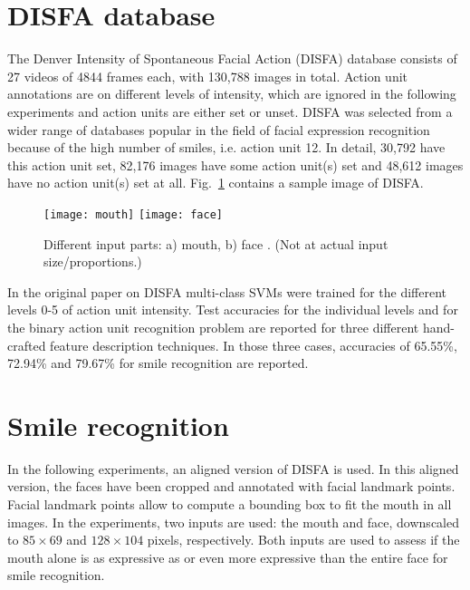 \documentclass{ws-procs9x6}
\begin{document}
\section{DISFA database}
\label{chapter:stateoftheart}
The Denver Intensity of Spontaneous Facial Action (DISFA) \cite{DISFA} database consists of 27 videos of 4844 frames each, with 130,788 images in total. Action unit annotations are on different levels of intensity, which are ignored in the following experiments and action units are either set or unset. DISFA was selected from a wider range of databases popular in the field of facial expression recognition because of the high number of smiles, i.e. action unit 12. In detail, 30,792 have this action unit set, 82,176 images have some action unit(s) set and 48,612 images have no action unit(s) set at all. Fig.~\ref{fig:mouth_face} contains a sample image of DISFA.

\begin{figure}[h!]
    \centering
    \hfill
    \texttt{[image: mouth]}
    \hfill
    \texttt{[image: face]}
    \hfill~
    \caption{Different input parts: a) mouth, b) face \cite{DISFA}. (Not at actual input size/proportions.)}
    \label{fig:mouth_face}
\end{figure}

In the original paper on DISFA \cite{DISFA} multi-class SVMs were trained for the different levels 0-5 of
action unit intensity. Test accuracies for the individual levels and for the binary action unit recognition
problem are reported for three different hand-crafted feature description techniques. In those three cases,
accuracies of 65.55\%, 72.94\% and 79.67\% for smile recognition are reported.



\section{Smile recognition}
\label{chapter:smile}
In the following experiments, an aligned version of DISFA is used. In this aligned version, the faces have been cropped and annotated with facial landmark points. Facial landmark points allow to compute a bounding box to fit the mouth in all images. In the experiments, two inputs are used: the mouth and face, downscaled to $85\times 69$ and $128\times 104$ pixels, respectively. Both inputs are used to assess if the mouth alone is as expressive as or even more expressive than the entire face for smile recognition.
\end{document}
